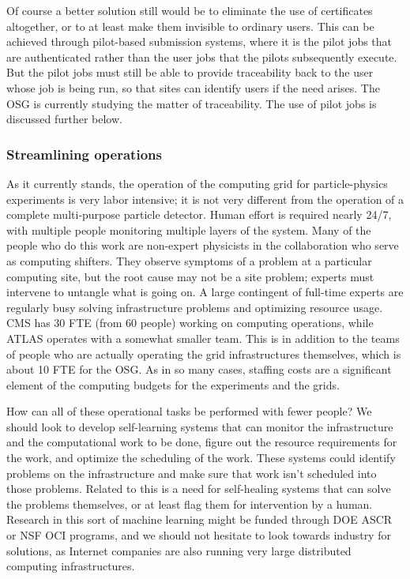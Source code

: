 Of course a better solution still would be to eliminate the use of certificates altogether, or to at least make them invisible to ordinary users.  This can be achieved through pilot-based submission systems, where it is the pilot jobs that are authenticated rather than the user jobs that the pilots subsequently execute.  But the pilot jobs must still be able to provide traceability back to the user whose job is being run, so that sites can identify users if the need arises.  The OSG is currently studying the matter of traceability.  The use of pilot jobs is discussed further below.

\subsubsection{Streamlining operations}

As it currently stands, the operation of the computing grid for particle-physics experiments is very labor intensive; it is not very different from the operation of a complete multi-purpose particle detector.  Human effort is required nearly 24/7, with multiple people monitoring multiple layers of the system.  Many of the people who do this work are non-expert physicists in the collaboration who serve as computing shifters.  They observe symptoms of a problem at a particular computing site, but the root cause may not be a site problem; experts must intervene to untangle what is going on.  A large contingent of full-time experts are regularly busy solving infrastructure problems and optimizing resource usage.  CMS has 30 FTE (from 60 people) working on computing operations, while ATLAS operates with a somewhat smaller team. This is in addition to the teams of people who are actually operating the grid infrastructures themselves, which is about 10 FTE for the OSG.  As in so many cases, staffing costs are a significant element of the computing budgets for the experiments and the grids.

How can all of these operational tasks be performed with fewer people?  We should look to develop self-learning systems that can monitor the infrastructure and the computational work to be done, figure out the resource requirements for the work, and optimize the scheduling of the work.  These systems could identify problems on the infrastructure and make sure that work isn’t scheduled into those problems.  Related to this is a need for self-healing systems that can solve the problems themselves, or at least flag them for intervention by a human.  Research in this sort of machine learning might be funded through DOE ASCR or NSF OCI programs, and we should not hesitate to look towards industry for solutions, as Internet companies are also running very large distributed computing infrastructures.

